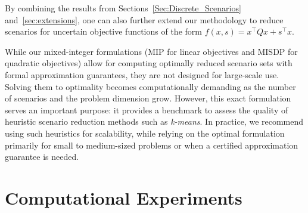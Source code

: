 \documentclass{article}
\begin{document}
By combining the results from Sections~\ref{Sec:Discrete_Scenarios} and~\ref{sec:extensions}, one can also further extend our methodology to reduce scenarios for uncertain objective functions of the form $f(x,s)=x^\top Q x + s^\top x$.

While our mixed-integer formulations (MIP for linear objectives and MISDP for quadratic objectives) allow for computing optimally reduced scenario sets with formal approximation guarantees, they are not designed for large-scale use. Solving them to optimality becomes computationally demanding as the number of scenarios and the problem dimension grow. However, this exact formulation serves an important purpose: it provides a benchmark to assess the quality of heuristic scenario reduction methods such as \emph{k-means}. In practice, we recommend using such heuristics for scalability, while relying on the optimal formulation primarily for small to medium-sized problems or when a certified approximation guarantee is needed.





\section{Computational Experiments}
\label{sec:experiments}
\end{document}
